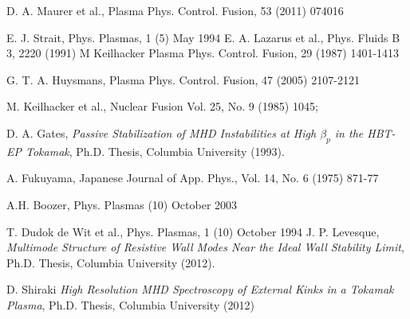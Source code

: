 \documentclass[aps,prl,twocolumn,superscriptaddress,groupedaddress]{revtex4}  %
\begin{document}
\begin{thebibliography}{99}
 D. A. Maurer et al., Plasma Phys. Control. Fusion, 53 (2011) 074016

 E. J. Strait, Phys. Plasmas, 1 (5) May 1994
 E. A. Lazarus et al., Phys. Fluids B 3, 2220 (1991)
 M Keilhacker Plasma Phys. Control. Fusion, 29 (1987) 1401-1413

 G. T. A. Huysmans, Plasma Phys. Control. Fusion, 47 (2005) 2107-2121 

 M. Keilhacker et al., Nuclear Fusion Vol. 25, No. 9 (1985) 1045;

 D. A. Gates, \emph{Passive Stabilization of MHD Instabilities at High ${\beta_p}$ in the HBT-EP Tokamak}, Ph.D. Thesis, Columbia University (1993).

 A. Fukuyama, Japanese Journal of App. Phys., Vol. 14, No. 6 (1975) 871-77 

 A.H. Boozer, Phys. Plasmas (10) October 2003


 T. Dudok de Wit et al., Phys. Plasmas, 1 (10) October 1994
 J. P. Levesque, \emph{Multimode Structure of Resistive Wall Modes Near the Ideal Wall Stability Limit}, Ph.D. Thesis, Columbia University (2012).

 D. Shiraki \emph{High Resolution MHD Spectroscopy of External Kinks in a Tokamak Plasma}, Ph.D. Thesis, Columbia University (2012)

\end{thebibliography}
\end{document}
